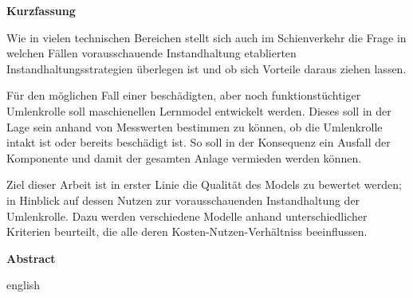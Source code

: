 \begin{center}
	\textbf{Kurzfassung}
\end{center}
\raggedright
Wie in vielen technischen Bereichen stellt sich auch im Schienverkehr die Frage in welchen Fällen vorausschauende Instandhaltung etablierten Instandhaltungsstrategien überlegen ist und ob sich Vorteile daraus ziehen lassen.

Für den möglichen Fall einer beschädigten, aber noch funktionstüchtiger Umlenkrolle soll maschienellen Lernmodel entwickelt werden. Dieses soll in der Lage sein anhand von Messwerten bestimmen zu können, ob die Umlenkrolle intakt ist oder bereits beschädigt ist. So soll in der Konsequenz ein Ausfall der Komponente und damit der gesamten Anlage vermieden werden können.

Ziel dieser Arbeit ist in erster Linie die Qualität des Models zu bewertet werden; in Hinblick auf dessen Nutzen zur vorausschauenden Instandhaltung der Umlenkrolle. Dazu werden verschiedene Modelle anhand unterschiedlicher Kriterien beurteilt, die alle deren Kosten-Nutzen-Verhältniss beeinflussen. 
\clearpage
\begin{center}
	\textbf{Abstract}
\end{center}
\raggedright
english
\clearpage